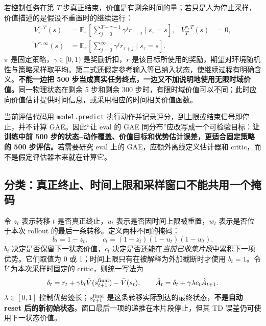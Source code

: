 \documentclass[12pt,fontset=none]{ctexart}
\numberwithin{equation}{section}
\numberwithin{table}{section}
\numberwithin{figure}{section}
\begin{document}
若控制任务在第 $T$ 步真正结束，价值是有剩余时间的量；若只是人为停止采样，价值描述的是假设不重置时的继续运行：
\begin{align}
 V^{\pi,T}_\tau(s)&=\mathbb E_\pi\!\left[\sum_{j=0}^{T-\tau-1}\gamma^j r_{\tau+j}\mid s_\tau=s\right],
 &V^{\pi,T}_T(s)&=0,\label{eq:gaet-finitevalue}\\
 V^{\pi,\infty}(s)&=\mathbb E_\pi\!\left[\sum_{j=0}^{\infty}\gamma^j r_{\tau+j}\mid s_\tau=s\right].&&\label{eq:gaet-contvalue}
\end{align}
$\pi$ 是固定策略，$\gamma\in[0,1)$ 是奖励折扣，$r$ 是该目标所使用的奖励，期望对环境随机性与策略采样取平均。第二式还假定参考输入等已纳入状态，使继续过程有明确含义。\textbf{不能一边把 500 步当成真实任务终点，一边又不加说明地使用无限时域价值。}同一物理状态在剩余 5 步和剩余 300 步时，有限时域价值可以不同；此时应向价值估计提供时间信息，或采用相应的时间相关价值函数\cite{Atimelimits}。

当前评估代码用 \texttt{model.predict} 执行动作并记录评分，到上限或结束信号即停止，并不计算 GAE。因此``让 eval 的 GAE 同分布''应改写成一个可检验目标：\textbf{让训练中前 500 步的状态--动作覆盖、价值目标和优势估计误差，更适合固定策略的 500 步评估。}若需要研究 eval 上的 GAE，应额外离线定义估计器和 critic，而不是假定评估器本来就在计算它。

\subsection{分类：真正终止、时间上限和采样窗口不能共用一个掩码}

令 $z_t$ 表示转移 $t$ 是否真正终止，$u_t$ 表示是否因时间上限被重置，$w_t$ 表示是否位于本次 rollout 的最后一条转移。定义两种不同的掩码：
\begin{equation}\label{eq:gaet-masks}
 b_t=1-z_t,\qquad
 c_t=(1-z_t)(1-u_t)(1-w_t).
\end{equation}
$b_t$ 决定是否保留下一状态价值，$c_t$ 决定是否还能在\emph{当前已收集片段}中累积下一项优势。它们取值为 0 或 1；时间上限只有在被解释为外加截断时才使用 $b_t=1$。令 $\bar V$ 为本次采样时固定的 critic，则统一写法为
\begin{equation}\label{eq:gaet-maskedrecursion}
 \delta_t=r_t+\gamma b_t\bar V(s_{t+1}^{\rm final})-\bar V(s_t),
 \qquad
 \hat A_t=\delta_t+\gamma\lambda c_t\hat A_{t+1}.
\end{equation}
$\lambda\in[0,1]$ 控制优势迹长；$s_{t+1}^{\rm final}$ 是这条转移实际到达的最终状态，\textbf{不是自动 reset 后的新初始状态}。窗口最后一项的递推在本片段停止，但其 TD 误差仍可使用下一状态价值。
\end{document}
